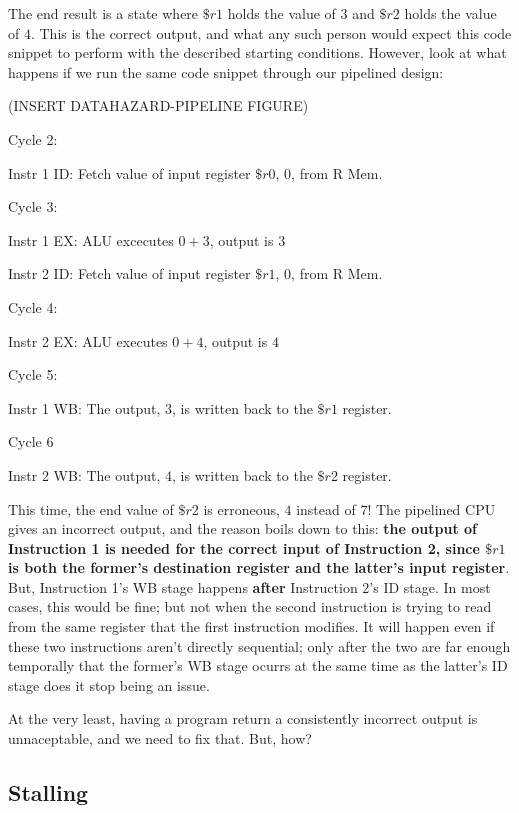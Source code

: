 \documentclass[12pt,twoside]{reedthesis}
\begin{document}
\vspace{5mm}

The end result is a state where $\$r1$ holds the value of $3$ and $\$r2$ holds the value of $4$. This is the correct output, and what any such person would expect this code snippet to perform with the described starting conditions. However, look at what happens if we run the same code snippet through our pipelined design:

(INSERT DATAHAZARD-PIPELINE FIGURE)

Cycle 2:

\qquad Instr 1 ID:  Fetch value of input register $\$r0$, $0$, from R Mem.

Cycle 3:

\qquad Instr 1 EX: ALU excecutes $0 + 3$, output is $3$

\qquad Instr 2 ID: Fetch value of input register $\$r1$, $0$, from R Mem.

Cycle 4:

\qquad Instr 2 EX: ALU executes $0 + 4$, output is $4$

Cycle 5:

\qquad Instr 1 WB: The output, $3$, is written back to the $\$r1$ register.

Cycle 6

\qquad Instr 2 WB: The output, $4$, is written back to the $\$r2$ register.

\vspace{5mm}

This time, the end value of $\$r2$ is erroneous, $4$ instead of $7$! The pipelined CPU gives an incorrect output, and the reason boils down to this: \textbf{the output of Instruction 1 is needed for the correct input of Instruction 2, since $\$r1$ is both the former's destination register and the latter's input register}. But, Instruction 1's WB stage happens \textbf{after} Instruction 2's ID stage. In most cases, this would be fine; but not when the second instruction is trying to read from the same register that the first instruction modifies. It will happen even if these two instructions aren't directly sequential; only after the two are far enough temporally that the former's WB stage ocurrs at the same time as the latter's ID stage does it stop being an issue.

At the very least, having a program return a consistently incorrect output is unnaceptable, and we need to fix that. But, how?

\subsection{Stalling}
\end{document}

